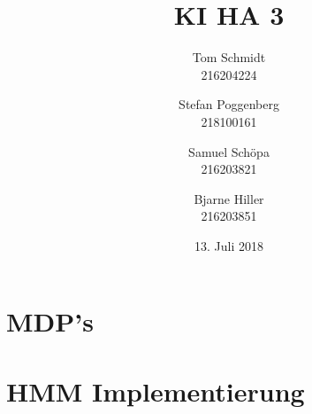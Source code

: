 \documentclass[fleqn]{scrartcl}
\author{Tom Schmidt\\216204224 \and Stefan Poggenberg\\218100161 \and Samuel Schöpa\\216203821 \and Bjarne Hiller\\216203851}
\title{KI HA 3}
\date{13. Juli 2018}
\begin{document}
\maketitle
\section{MDP's}
\section{HMM Implementierung}
\end{document}
